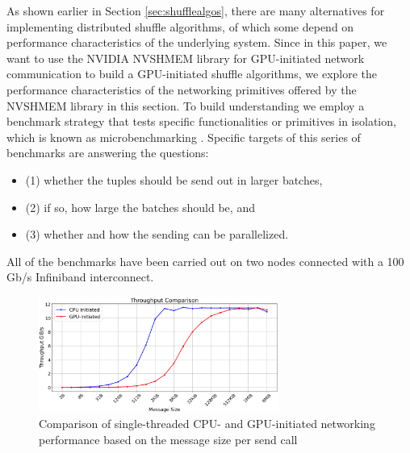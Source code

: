 As shown earlier in Section \ref{sec:shufflealgos}, there are many alternatives for implementing distributed shuffle algorithms, of which some depend on performance characteristics of the underlying system.
Since in this paper, we want to use the NVIDIA NVSHMEM library for GPU-initiated network communication to build a GPU-initiated shuffle algorithms, we explore the performance characteristics of the networking primitives offered by the NVSHMEM library in this section. To build understanding we employ a benchmark strategy that tests specific functionalities or primitives in isolation, which is known as microbenchmarking \cite{kounev2020systems}.
Specific targets of this series of benchmarks are answering the questions:

\begin{itemize}
    \item (1) whether the tuples should be send out in larger batches,
    \item (2) if so, how large the batches should be, and
    \item (3) whether and how the sending can be parallelized.
\end{itemize}

All of the benchmarks have been carried out on two nodes connected with a 100 Gb/s Infiniband interconnect.

\begin{figure}[h]
    \centering
    \includegraphics[width=0.7\textwidth]{img/09_gpu_cpu_st.png}
    \caption{Comparison of single-threaded CPU- and GPU-initiated networking performance based on the message size per send call}
    \label{fig:cpu_gpu_st}
\end{figure}

